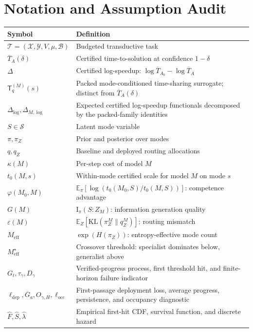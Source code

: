 \documentclass[10pt]{article}
\theoremstyle{paperplain}
\theoremstyle{paperdefinition}
\theoremstyle{paperremark}
\newcommand{\KL}{\mathrm{KL}}
\newcommand{\I}{\mathrm{I}}
\newcommand{\E}{\mathbb{E}}
\newcommand{\cX}{\mathcal{X}}
\newcommand{\cY}{\mathcal{Y}}
\newcommand{\cS}{\mathcal{S}}
\newcommand{\cT}{\mathcal{T}}
\newcommand{\cB}{\mathcal{B}}
\newcommand{\Meff}{M_{\mathrm{eff}}}
\newcommand{\Dlog}{\Delta_{\log}}
\newcommand{\DlogM}{\Delta_{M,\log}}
\begin{document}
\section{Notation and Assumption Audit}
\label{app:notation}

\begin{center}
\small
\renewcommand{\arraystretch}{1.2}
\begin{tabular}{@{}lp{9cm}@{}}
\toprule
\textbf{Symbol} & \textbf{Definition} \\
\midrule
$\cT = (\cX, \cY, V, \mu, \cB)$ & Budgeted transductive task \\
$\overline{T}_A(\delta)$ & Certified time-to-solution at confidence $1-\delta$ \\
$\Delta$ & Certified log-speedup: $\log \overline{T}_{A_0} - \log \overline{T}_A$ \\
$\mathsf{T}_q^{(M)}(s)$ & Packed mode-conditioned time-sharing surrogate; distinct from $\overline T_A(\delta)$ \\
$\Dlog,\DlogM$ & Expected certified log-speedup functionals decomposed by the packed-family identities \\
$S \in \cS$ & Latent mode variable \\
$\pi, \pi_Z$ & Prior and posterior over modes \\
$q, q_Z$ & Baseline and deployed routing allocations \\
$\kappa(M)$ & Per-step cost of model $M$ \\
$t_0(M,s)$ & Within-mode certified scale for model $M$ on mode $s$ \\
$\varphi(M_0,M)$ & $\E_\pi[\log(t_0(M_0,S)/t_0(M,S))]$: competence advantage \\
$G(M)$ & $\I_\pi(S : Z_M)$: information generation quality \\
$\varepsilon(M)$ & $\E_Z[\KL(\pi_Z^M \| q_Z^M)]$: routing mismatch \\
$\Meff$ & $\exp(H(\pi_Z))$: entropy-effective mode count \\
$\Meff^\star$ & Crossover threshold: specialist dominates below, generalist above \\
$G_t,\tau_\gamma,D_\gamma$ & Verified-progress process, first threshold hit, and finite-horizon failure indicator \\
$\ell_{\mathrm{dep}},\overline G_a,O_{\gamma,H},\ell_{\mathrm{occ}}$ & First-passage deployment loss, average progress, persistence, and occupancy diagnostic \\
$\widehat F,\widehat S,\widehat\lambda$ & Empirical first-hit CDF, survival function, and discrete hazard \\

\end{tabular}
\end{center}
\end{document}
